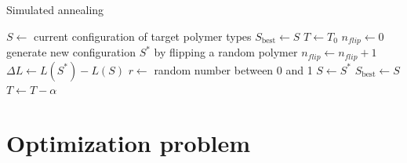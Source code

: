 \documentclass[bachelor,       %
               twoside,        %
               BCOR10mm,       %
               ngerman, english %
               ]{GAUBM}
\begin{document}
\begin{algorithm}[H]
\caption{Simulated annealing}\label{alg:sa}
\begin{algorithmic}[1]
\State $S \gets$ current configuration of target polymer types
\State $S_\text{best}\gets S$
\State $T \gets T_0$
    \State $n_{flip} \gets 0$
        \State generate new configuration $S^*$ by flipping a random polymer
        \State $n_{flip}\gets n_{flip}+1$
        \State $\Delta L\gets L(S^*)-L(S)$
        \State $r\gets$ random number between 0 and 1
            \State $S\gets S^*$
        \EndIf
    \EndWhile
{}
    \State $S_\text{best}\gets S$ 
\EndIf
\State $T\gets T-\alpha$ 
\EndWhile
\end{algorithmic}
\end{algorithm}

\chapter{Optimization problem}
\end{document}
